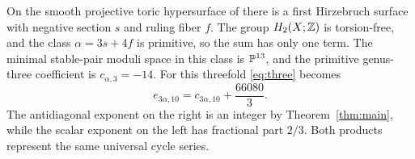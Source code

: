 On the smooth projective toric hypersurface of \cite{Counterexample}
there is a first Hirzebruch surface with negative section $s$ and
ruling fiber $f$. The group $H_2(X;\mathbb Z)$ is torsion-free, and the
class $\alpha=3s+4f$ is primitive, so the sum has only one term. The
minimal stable-pair moduli space in this class is $\mathbb P^{13}$,
and the primitive genus-three coefficient is $c_{\alpha,3}=-14$.
For this threefold \eqref{eq:three} becomes
\[
 e_{3\alpha,10}=c_{3\alpha,10}+\frac{66080}{3}.
\]
The antidiagonal exponent on the right is an integer by
Theorem~\ref{thm:main}, while the scalar exponent on the left
has fractional part $2/3$. Both products represent the same
universal cycle series.
